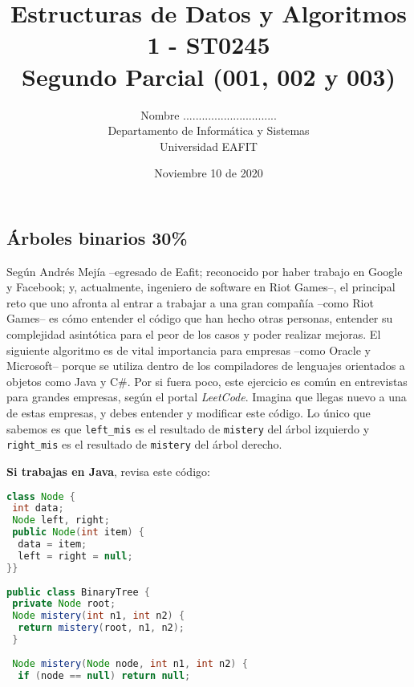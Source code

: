 \documentclass[10 pt]{article}
\title{\textbf {Estructuras de Datos y Algoritmos 1 - ST0245\\Segundo Parcial (001, 002 y 003) }}
\author{Nombre ..............................\\
		Departamento de Informática y Sistemas\\
		Universidad EAFIT\\}
\date{Noviembre 10 de 2020}
\begin{document}
\lstset{language=Java,frame=none, breaklines=true, numbers = left, stepnumber = 1, xleftmargin=5.0ex, showstringspaces=false, showspaces=false }
\lstset{language=Python,frame=none, breaklines=true, numbers = left, stepnumber = 1, xleftmargin=5.0ex, showstringspaces=false,showspaces=false }
\maketitle
\begin{multicols}{2}




\section{Árboles binarios 30\%}
Según Andrés Mejía --egresado de Eafit; reconocido por haber trabajo en Google y Facebook; y, actualmente, ingeniero de software en Riot Games--, el principal
reto que uno afronta al entrar a trabajar a una gran compañía --como Riot Games-- es cómo entender el código que han hecho otras personas, entender su
complejidad asintótica para el peor de los casos y poder realizar mejoras. El siguiente algoritmo es de vital importancia para empresas --como Oracle y
Microsoft-- porque se utiliza dentro de los compiladores de lenguajes orientados a objetos como Java y C\#. Por si fuera poco, este ejercicio es común en
entrevistas para grandes empresas, según el portal \textit{LeetCode}. Imagina que llegas nuevo a una de estas empresas, 
y debes entender y modificar este código. Lo único que sabemos es que \texttt{left\_mis} es el resultado de \texttt{mistery} del árbol izquierdo y  
\texttt{right\_mis} es el resultado de \texttt{mistery} del árbol derecho.

\textbf{Si trabajas en Java}, revisa este código:

{\footnotesize
\begin{lstlisting}[language=Java]
class Node { 
 int data; 
 Node left, right; 
 public Node(int item) { 
  data = item; 
  left = right = null; 
}} 
  
public class BinaryTree { 
 private Node root;  
 Node mistery(int n1, int n2) { 
  return mistery(root, n1, n2); 
 } 
  
 Node mistery(Node node, int n1, int n2) {     
  if (node == null) return null; 
  

\end{lstlisting}}
\end{multicols}
\end{document}
